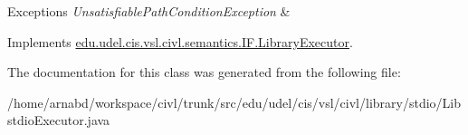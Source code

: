 \begin{DoxyExceptions}{Exceptions}
{\em Unsatisfiable\+Path\+Condition\+Exception} & \\
\hline
\end{DoxyExceptions}


Implements \hyperlink{interfaceedu_1_1udel_1_1cis_1_1vsl_1_1civl_1_1semantics_1_1IF_1_1LibraryExecutor_a383136ab6e875742f46b5dbd94673984}{edu.\+udel.\+cis.\+vsl.\+civl.\+semantics.\+I\+F.\+Library\+Executor}.



The documentation for this class was generated from the following file\+:\begin{DoxyCompactItemize}
\item 
/home/arnabd/workspace/civl/trunk/src/edu/udel/cis/vsl/civl/library/stdio/Libstdio\+Executor.\+java\end{DoxyCompactItemize}
